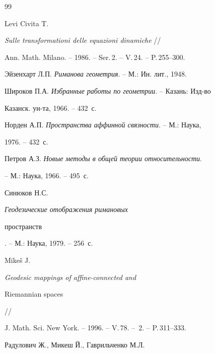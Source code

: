 \begin{thebibliography}{99}







Levi Civita T.


{\it Sulle transformationi delle equazioni dinamiche} //


Ann. Math. Milano. -- 1986. -- Ser.\,2. -- V.\,24. -- P.\,255--300.







Эйзенхарт Л.П. {\it Риманова геометрия}. -- М.: Ин. лит., 1948.







Широков П.А. {\it Избранные работы по геометрии}. -- Казань: Изд-во


Казанск. ун-та, 1966. -- 432~с.







Норден А.П. {\it Пространства аффинной связности}. -- М.: Наука,


1976. -- 432~с.







Петров А.З. {\it Новые методы в общей теории относительности}. 


-- М.: Наука, 1966. -- 495~с. 







Синюков Н.С. {\it Геодезические отображения римановых


пространств}. -- М.: Наука, 1979. -- 256~с.







Mike\v s J. {\it Geodesic mappings of affine-connected and


Riemannian spaces} // 


J. Math. Sci. New York. -- 1996. -- V.\,78. -- \No\,2. -- P.\,311--333.







Радулович Ж., Микеш Й., Гаврильченко М.Л. 



\end{thebibliography}
